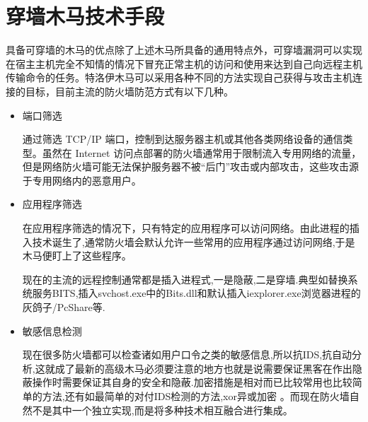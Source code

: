 \section{穿墙木马技术手段}
具备可穿墙的木马的优点除了上述木马所具备的通用特点外，可穿墙漏洞可以实现在宿主主机完全不知情的情况下冒充正常主机的访问和使用来达到自己向远程主机传输命令的任务。特洛伊木马可以采用各种不同的方法实现自己获得与攻击主机连接的目标，目前主流的防火墙防范方式有以下几种。
\begin{itemize}
\item{端口筛选}

通过筛选 TCP/IP 端口，控制到达服务器主机或其他各类网络设备的通信类型。虽然在 Internet 访问点部署的防火墙通常用于限制流入专用网络的流量，但是网络防火墙可能无法保护服务器不被“后门”攻击或内部攻击，这些攻击源于专用网络内的恶意用户\cite{2}。

\item{应用程序筛选}

在应用程序筛选的情况下，只有特定的应用程序可以访问网络\cite{3}。由此进程的插入技术诞生了,通常防火墙会默认允许一些常用的应用程序通过访问网络,于是木马便盯上了这些程序。	

现在的主流的远程控制通常都是插入进程式,一是隐蔽,二是穿墙.典型如替换系统服务BITS,插入svchost.exe中的Bits.dll和默认插入iexplorer.exe浏览器进程的灰鸽子/PcShare等.
 
\item{敏感信息检测}

现在很多防火墙都可以检查诸如用户口令之类的敏感信息,所以抗IDS,抗自动分析,这就成了最新的高级木马必须要注意的地方也就是说需要保证黑客在作出隐蔽操作时需要保证其自身的安全和隐蔽.加密措施是相对而已比较常用也比较简单的方法,还有如最简单的对付IDS检测的方法,xor异或加密\cite{5} 。而现在防火墙自然不是其中一个独立实现,而是将多种技术相互融合进行集成。
　　
\end{itemize}


